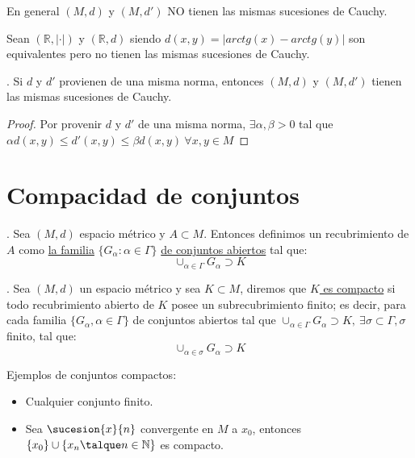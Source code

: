 	\begin{nota} En general $(M,d)$ y $(M,d')$ NO tienen las mismas sucesiones de Cauchy.
	\end{nota}
	    
	\begin{ejem}Sean $(\mathbb{R},|\cdot|)$ y $(\mathbb{R},d)$ siendo $d(x,y)=|arctg(x)-arctg(y)|$ son equivalentes pero no tienen las mismas sucesiones de Cauchy.
	\end{ejem}
	    
	\begin{proposicion}. Si $d$ y $d'$ provienen de una misma norma, entonces $(M,d)$ y $(M,d')$ tienen las mismas sucesiones de Cauchy.
	    \begin{proof}
	    	Por provenir $d$ y $d'$ de una misma norma, $\exists\alpha,\beta>0$ tal que $\alpha d(x,y)\leq d'(x,y)\leq \beta d(x,y)\ \forall x,y\in M$
	    \end{proof}
	\end{proposicion}
	    
	\section{Compacidad de conjuntos}	    
	 
	\begin{defi}. Sea $(M,d)$ espacio m\'etrico y $A\subset M$. Entonces definimos un recubrimiento de $A$ como \underline{la familia} $\{G_\alpha:\alpha\in\Gamma\}$ \underline{de conjuntos abiertos} tal que: \[\cup_{\alpha\in\Gamma}G_\alpha\supset K\]
	\end{defi}
	    
	\begin{defi}. Sea $(M,d)$ un espacio m\'etrico y sea $K\subset M$, diremos que \underline{$K$ es compacto} si todo recubrimiento abierto de $K$ posee un subrecubrimiento finito; es decir, para cada familia $\{G_\alpha,\alpha\in\Gamma\}$ de conjuntos abiertos tal que $\cup_{\alpha\in\Gamma}G_\alpha\supset K,\ \exists\sigma\subset\Gamma, \sigma$ finito, tal que: \[\cup_{\alpha\in\sigma}G_\alpha\supset K\]
	\end{defi}
	    
	\begin{ejem} Ejemplos de conjuntos compactos:
		\begin{itemize}
	  		\item Cualquier conjunto finito.
	  		\item Sea $\sucesion{x}{n}$ convergente en $M$ a $x_0$, entonces $\{ x_0\}\cup\{ x_n\talque n\in \mathbb{N}	\}$ es compacto.
		\end{itemize}
	\end{ejem}
	  
